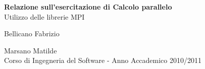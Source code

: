 \documentclass[12pt]{report}
\begin{document}
\begin{titlepage}
\begin{center}


\huge \textbf{Relazione sull'esercitazione di Calcolo parallelo} \\
\LARGE Utilizzo delle librerie MPI \\[1.5cm]
\item \Large Bellicano Fabrizio\\
\item \Large Marsano Matilde\\[1.5cm]


Corso di Ingegneria del Software - Anno Accademico 2010/2011
\end{center}
\end{titlepage}





\newpage
\end{document}
